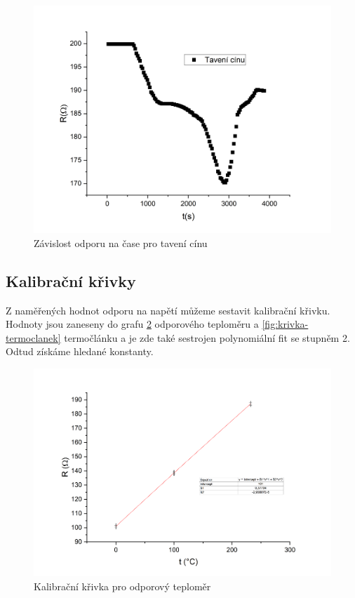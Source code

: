 \begin{figure}[h]
    \centering
    \includegraphics[width=0.5\linewidth]{8 - Kalibrace odporového teploměru a termočlánku//Prototkol - kalibrace teploměru//img/Závislost R na t, tavení cínu.png}
    \caption{Závislost odporu na čase pro tavení cínu}
    \label{fig:odpor-na-teplote-cin}
\end{figure}

\subsection{Kalibrační křivky}
Z naměřených hodnot odporu na napětí můžeme sestavit kalibrační křivku. Hodnoty jsou zaneseny do grafu \ref{fig:krivka-odpor} odporového teploměru a \ref{fig:krivka-termoclanek} termočlánku a je zde také sestrojen polynomiální fit se stupněm 2. Odtud získáme hledané konstanty.

\begin{figure}[h]
    \centering
    \includegraphics[width=0.8\linewidth]{8 - Kalibrace odporového teploměru a termočlánku//Prototkol - kalibrace teploměru//img/Závislost R na t, parabola.png}
    \caption{Kalibrační křivka pro odporový teploměr}
    \label{fig:krivka-odpor}
\end{figure}

